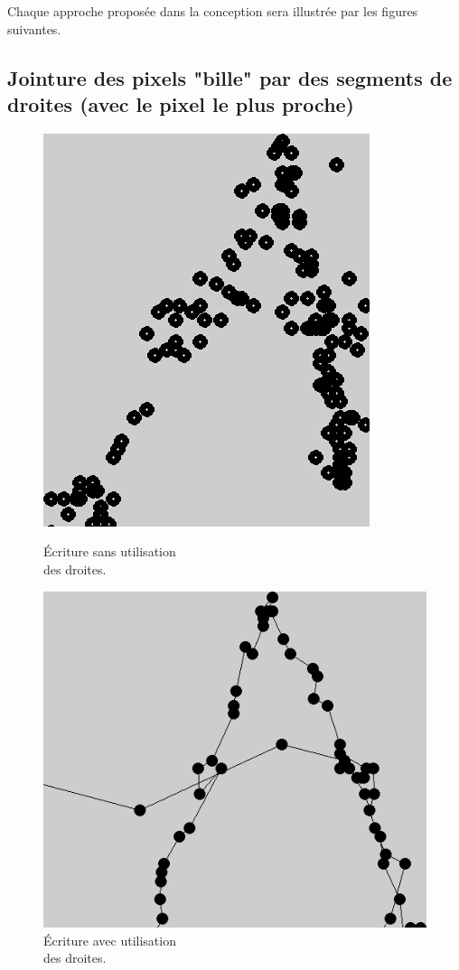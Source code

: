 \documentclass[12pt,a4paper,oneside]{book}
\begin{document}
	
	Chaque approche proposée dans la conception sera illustrée par les figures suivantes.
	
	\subsection{Jointure des pixels "bille" par des segments de droites (avec le pixel le plus proche)}
	
	\begin{figure}[H]
		\begin{minipage}[H]{0.5\linewidth}
			\centering
			\includegraphics[scale=0.98]{avantp.jpg}
			\caption{Écriture sans utilisation \\des droites.}
			\label{fig19}
		\end{minipage}
		\begin{minipage}[H]{0.5\linewidth}
			\centering
			\includegraphics[scale=0.98]{apresp.jpg}
			\caption{Écriture avec utilisation \\des droites.}
			\label{fig20}
		\end{minipage}
	\end{figure}
	
\end{document}
